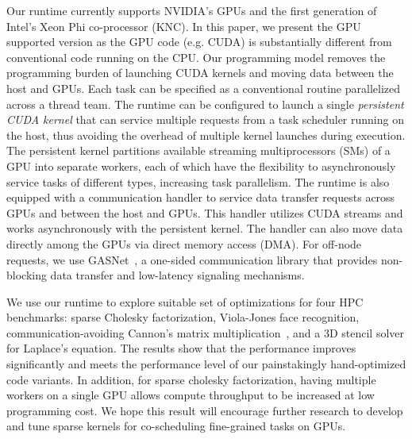 Our runtime currently supports NVIDIA's GPUs and the first generation of Intel's Xeon Phi co-processor (KNC).
In this paper, we present the GPU supported version as the GPU code (e.g. CUDA) is substantially different from conventional code running on the CPU.
Our programming model removes the programming burden of launching CUDA kernels and moving data between the host and GPUs.
Each task can be specified as a conventional routine parallelized across a thread team.
The runtime can be configured to launch a single {\em persistent CUDA kernel} that can service multiple requests from a task scheduler running on the host, thus avoiding the overhead of multiple kernel launches during execution.
The persistent kernel partitions available streaming multiprocessors (SMs) of a GPU into separate workers, each of which have the flexibility to asynchronously service tasks of different types, increasing task parallelism.
The runtime is also equipped with a communication handler to service data transfer requests across GPUs and between the host and GPUs.
This handler utilizes CUDA streams and works asynchronously with the persistent kernel.
The handler can also move data directly among the GPUs via direct memory access (DMA).
For off-node requests, we use GASNet~\cite{Bonachea:2002:gasnet}, a one-sided communication library %
that provides non-blocking data transfer and low-latency signaling mechanisms. %

We use our runtime to explore suitable set of optimizations for four HPC benchmarks: sparse Cholesky factorization, Viola-Jones face recognition, communication-avoiding Cannon's matrix multiplication~\cite{25Dcannon}, and a 3D stencil solver for Laplace's equation.
The results show that the performance improves significantly and meets the performance level of our painstakingly hand-optimized code variants.
In addition, for sparse cholesky factorization, having multiple workers on a single GPU allows compute throughput to be increased at low programming cost. 
We hope this result will encourage further research to develop and tune sparse kernels for co-scheduling fine-grained tasks on GPUs.

